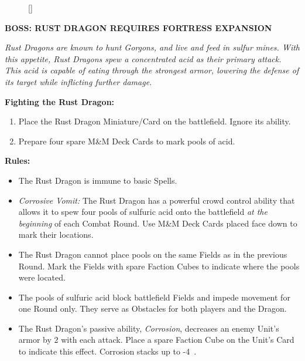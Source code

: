 \begin{figure}
  \raisebox{0pt}[\dimexpr{}\baselineskip\relax]{}
  \vspace*{\baselineskip}
\end{figure}
{
  \textbf{\MakeUppercase{Boss: Rust Dragon {\scriptsize Requires Fortress Expansion}}}

  \medskip

  \textit{Rust Dragons are known to hunt Gorgons, and live and feed in sulfur mines.
    With this appetite, Rust Dragons spew a concentrated acid as their primary attack.
    This acid is capable of eating through the strongest armor, lowering the defense of its target while inflicting further damage.
  }

  \medskip

  \textbf{Fighting the Rust Dragon:}
  \begin{enumerate}
    \item Place the Rust Dragon Miniature/Card on the battlefield.
      Ignore its ability.
    \item Prepare four spare M\&M Deck Cards to mark pools of acid.
  \end{enumerate}

  \medskip

  \textbf{Rules:}
  \begin{itemize}
    \item The Rust Dragon is immune to basic Spells.
    \item \textit{Corrosive Vomit:} The Rust Dragon has a powerful crowd control ability that allows it to spew four pools of sulfuric acid onto the battlefield \textit{at the beginning} of each Combat Round.
      Use M\&M Deck Cards placed face down to mark their locations.
    \item The Rust Dragon cannot place pools on the same Fields as in the previous Round.
      Mark the Fields with spare Faction Cubes to indicate where the pools were located.
    \item The pools of sulfuric acid block battlefield Fields and impede movement for one Round only.
      They serve as Obstacles for both players and the Dragon.
    \item The Rust Dragon's passive ability, \textit{Corrosion}, decreases an enemy Unit's armor by 2 with each attack.
      Place a spare Faction Cube on the Unit's Card to indicate this effect.
      Corrosion stacks up to -4~.
  \end{itemize}
}

